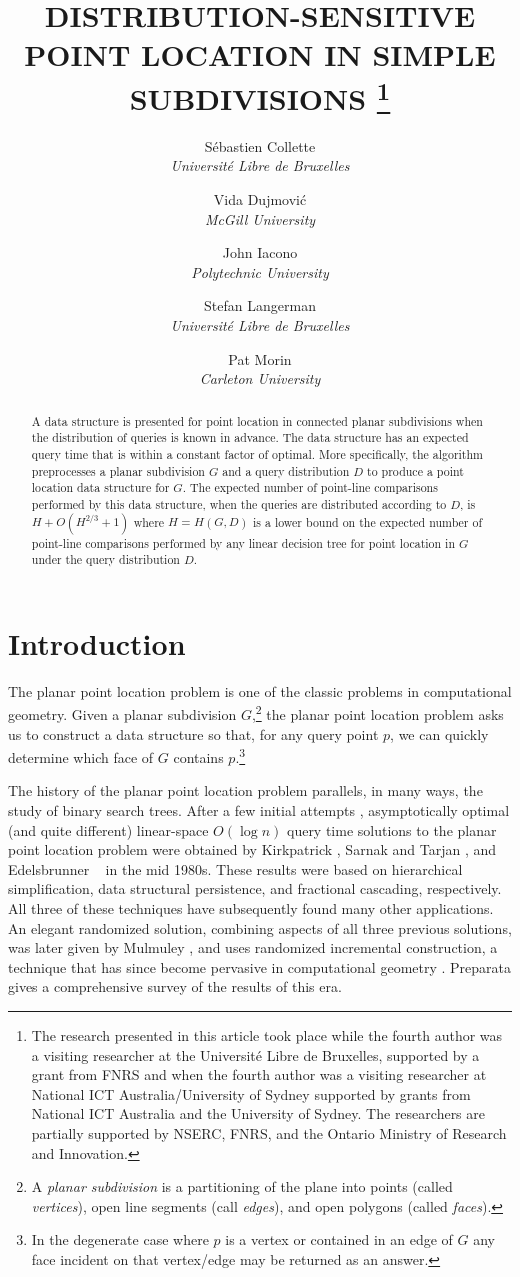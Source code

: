 \documentclass[charterfonts,lotsofwhite]{patmorin}
\title{\MakeUppercase{Distribution-Sensitive Point 
	Location in Simple Subdivisions}%
	\thanks{The research presented in this article took place
while the fourth author was a visiting researcher at the Universit\'e Libre de
Bruxelles, supported by a grant from FNRS and when the fourth author
was a visiting researcher at National ICT Australia/University of
Sydney supported by grants from National ICT Australia and the
University of Sydney.  The researchers are
partially supported by NSERC, FNRS, and the Ontario Ministry of Research and
Innovation.}}
\author{S\'ebastien Collette \\ \textit{Universit\'e Libre de Bruxelles}
  \and Vida Dujmovi\'c \\ \textit{McGill University}
  \and John Iacono \\ \textit{Polytechnic University}
  \and Stefan Langerman \\ \textit{Universit\'e Libre de Bruxelles}
  \and Pat Morin \\ \textit{Carleton University}}
\date{}
\begin{document}
\maketitle

\begin{abstract}
A data structure is presented for point location in connected planar
subdivisions when the distribution of queries is known in advance.
The data structure has an expected query time that is within a
constant factor of optimal.  More specifically, the algorithm
preprocesses a planar subdivision $G$ and a query distribution $D$ to
produce a point location data structure for $G$. The expected number
of point-line comparisons performed by this data structure, when the
queries are distributed according to $D$, is $H +
O(H^{2/3}+1)$ where $H=H(G,D)$ is a lower bound on the expected number of
point-line comparisons performed by any linear decision tree for point
location in $G$ under the query distribution $D$.
\end{abstract}


\section{Introduction}

The planar point location problem is one of the classic problems in
computational geometry. Given a planar subdivision $G$,\footnote{A
\emph{planar subdivision} is a partitioning of the plane into points
(called \emph{vertices}), open line segments (call \emph{edges}), and
open polygons (called \emph{faces}).} the planar point location
problem asks us to construct a data structure so that, for any query
point $p$, we can quickly determine which face of $G$ contains
$p$.\footnote{In the degenerate case where $p$ is a vertex or contained
in an edge of $G$ any face incident on that vertex/edge may be
returned as an answer.}

The history of the planar point location problem parallels, in many
ways, the study of binary search trees.  After a few initial attempts
\cite{dl76,lp77,p81}, asymptotically optimal (and quite different)
linear-space $O(\log n)$ query time solutions to the planar point
location problem were obtained by Kirkpatrick \cite{k83}, Sarnak and
Tarjan \cite{st86}, and Edelsbrunner \etal\ \cite{egs86} in the mid
1980s.  These results were based on hierarchical simplification, data
structural persistence, and fractional cascading, respectively.  All
three of these techniques have subsequently found many other
applications.  An elegant randomized solution, combining aspects of
all three previous solutions, was later given by Mulmuley \cite{m90},
and uses randomized incremental construction, a technique that has
since become pervasive in computational geometry
\cite[Section~9.5]{bcko08}.  Preparata \cite{p90} gives a
comprehensive survey of the results of this era.
\end{document}
